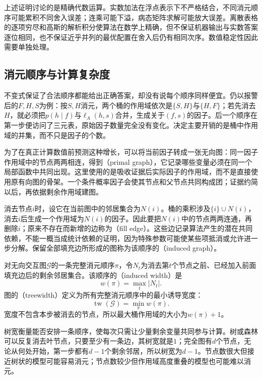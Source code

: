 上述证明讨论的是精确代数运算。实数加法在浮点表示下不严格结合，不同消元顺序可能累积不同舍入误差；连乘可能下溢，病态矩阵求解可能放大误差。离散表格的逐项穷尽和高斯的解析积分使算法在数学上精确，但不保证机器输出与实数答案逐位相同，也不保证近乎并列的最优配置在舍入后仍有相同次序。数值稳定性因此需要单独处理。

\subsection{消元顺序与计算复杂度}
\label{sec:pgm-elimination-complexity}

不变式保证了合法顺序都能给出正确答案，却没有说每个顺序同样便宜。仍以报警后的$F,H,S$为例：按$S,H$消元，两个桶的作用域依次是$\{S,H\}$与$\{H,F\}$；若先消去$H$，就必须把$p(h\mid f)$与$\ell_A(h,s)$合并，生成关于$(f,s)$的因子。后一个顺序在第一步便访问了三元表，原始因子数量完全没有变化。决定主要开销的是桶中作用域的并集，而不只是因子的个数。

为了在真正计算数值前预测这种增长，可以将当前因子转成一张无向图：同一因子作用域中的节点两两相连，得到（primal graph），它记录哪些变量必须在同一个局部函数中共同出现。这里使用的是吸收证据后实际因子的作用域，而不是直接使用原有向图的骨架。一个条件概率因子会使其节点和父节点共同构成团；证据约简以后，再依据剩余作用域建图。

消去节点$i$时，设它在当前图中的邻居集合为$N(i)$。桶的乘积涉及$\{i\}\cup N(i)$，消去$i$后生成一个作用域为$N(i)$的因子。因此要把$N(i)$中的节点两两连通，再删除$i$；原来不存在而新增的边称为（fill edge）。这些边记录算法产生的潜在共同依赖，不能一概当成统计依赖的证明，因为特殊参数可能使某些项抵消或允许进一步分解。保留全部填充边所形成的图称为该顺序的（induced graph）。

\begin{definition}[诱导宽度与树宽]
  \label{def:pgm-elimination-treewidth}
  对无向交互图$\mathcal{G}$的一条完整消元顺序$\pi$，令$N_t$为消去第$t$个节点之前、已经加入前面填充边后的剩余邻居集合。该顺序的（induced width）是
  \[
    w(\pi)=\max_t|N_t|.
  \]
  图的（treewidth）定义为所有完整消元顺序中的最小诱导宽度：
  \[
    \operatorname{tw}(\mathcal{G})=\min_\pi w(\pi).
  \]
  宽度不包含本步被消去的节点，所以最大桶作用域的大小为$w(\pi)+1$。
\end{definition}

树宽衡量能否安排一条顺序，使每次只需让少量剩余变量共同参与计算。树或森林可以反复消去叶节点，只要至少有一条边，其树宽就是$1$；完全图有$d$个节点，无论从何处开始，第一步都有$d-1$个剩余邻居，所以树宽为$d-1$。节点数很大但接近树状的模型可能容易消元；节点数较少但作用域高度重叠的模型也可能难以消元。

